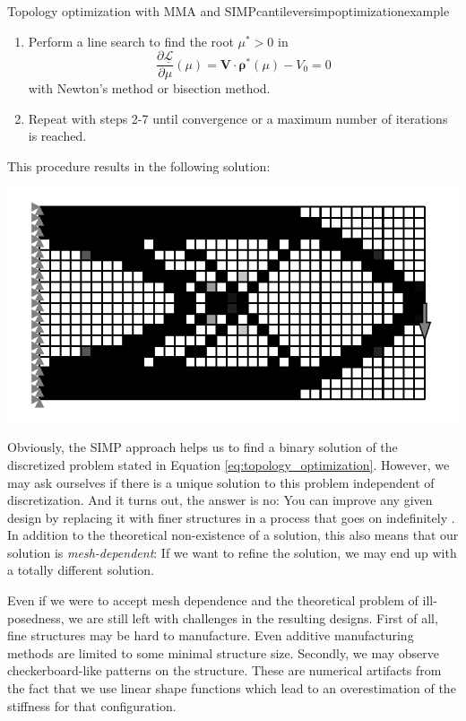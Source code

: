 \begin{example}{Topology optimization with MMA and SIMP}{cantileversimpoptimizationexample}
\begin{enumerate}
\begin{align}
            \end{align}
        \item Perform a line search to find the root $\mu^*>0$ in 
        \begin{equation}
            \frac{\partial \underline{\mathcal{L}}}{\partial \mu}(\mu) = \mathbf{V} \cdot \pmb{\rho}^* (\mu) - V_0  = 0
        \end{equation}
        with Newton's method or bisection method. 
        \item Repeat with steps 2-7 until convergence or a maximum number of iterations is reached.
    \end{enumerate}

    This procedure results in the following solution:
    \begin{center}
        \includegraphics[width=0.7\linewidth]{figures/cantilever_fem_optimized_binary.pdf}
    \end{center}
\end{example}

Obviously, the SIMP approach helps us to find a binary solution of the discretized problem stated in Equation \eqref{eq:topology_optimization}. However, we may ask ourselves if there is a unique solution to this problem independent of discretization. And it turns out, the answer is no: You can improve any given design by replacing it with finer structures in a process that goes on indefinitely \cite{Christensen2008}. 
In addition to the theoretical non-existence of a solution, this also means that our solution is \emph{mesh-dependent}: If we want to refine the solution, we may end up with a totally different solution. 

Even if we were to accept mesh dependence and the theoretical problem of ill-posedness, we are still left with challenges in the resulting designs. First of all, fine structures may be hard to manufacture. Even additive manufacturing methods are limited to some minimal structure size. Secondly, we may observe checkerboard-like patterns on the structure. These are numerical artifacts from the fact that we use linear shape functions which lead to an overestimation of the stiffness for that configuration.

